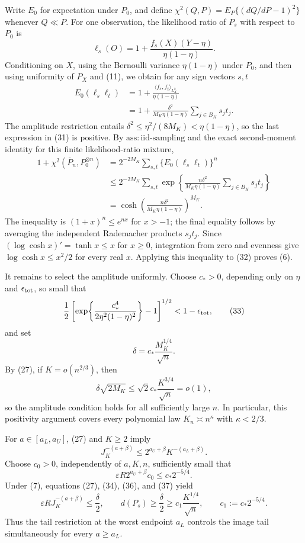 Write \(E_0\) for expectation under \(P_0\), and define \(\chi^2(Q,P)=E_P\{(dQ/dP-1)^2\}\) whenever \(Q\ll P\).  For one observation, the likelihood ratio of \(P_s\) with respect to \(P_0\) is
\[
\ell_s(O)
=1+\frac{f_s(X)(Y-\eta)}{\eta(1-\eta)}.
\tag{30}
\]
Conditioning on \(X\), using the Bernoulli variance \(\eta(1-\eta)\) under \(P_0\), and then using uniformity of \(P_X\) and (11), we obtain for any sign vectors \(s,t\)
\[
\begin{aligned}
E_0(\ell_s\ell_t)
&=1+\frac{\langle f_s,f_t\rangle_{L^2_X}}{\eta(1-\eta)} \\
&=1+\frac{\delta^2}{M_K\eta(1-\eta)}
      \sum_{j\in B_K}s_jt_j.
\end{aligned}
\tag{31}
\]
The amplitude restriction entails \(\delta^2\le\eta^2/(8M_K)<\eta(1-\eta)\), so the last expression in (31) is positive.  By \(\mathrm{ass:iid\mbox{-}sampling}\) and the exact second-moment identity for this finite likelihood-ratio mixture,
\[
\begin{aligned}
1+\chi^2(\overline P_n,P_0^{\otimes n})
&=2^{-2M_K}\sum_{s,t}\{E_0(\ell_s\ell_t)\}^n \\
&\le2^{-2M_K}\sum_{s,t}
\exp\!\left\{
 \frac{n\delta^2}{M_K\eta(1-\eta)}
 \sum_{j\in B_K}s_jt_j
\right\} \\
&=\cosh\!\left(
 \frac{n\delta^2}{M_K\eta(1-\eta)}
\right)^{M_K}.
\end{aligned}
\tag{32}
\]
The inequality is \((1+x)^n\le e^{nx}\) for \(x>-1\); the final equality follows by averaging the independent Rademacher products \(s_jt_j\).  Since \((\log\cosh x)'=\tanh x\le x\) for \(x\ge0\), integration from zero and evenness give \(\log\cosh x\le x^2/2\) for every real \(x\).  Applying this inequality to (32) proves (6).

It remains to select the amplitude uniformly.  Choose \(c_*>0\), depending only on \(\eta\) and \(\epsilon_{\rm tot}\), so small that
\[
\frac12\left[
\exp\!\left\{\frac{c_*^4}{2\eta^2(1-\eta)^2}\right\}-1
\right]^{1/2}<1-\epsilon_{\rm tot},
\tag{33}
\]
and set
\[
\delta=c_*\frac{M_K^{1/4}}{\sqrt n}.
\tag{34}
\]
By (27), if \(K=o(n^{2/3})\), then
\[
\delta\sqrt{2M_K}
\le\sqrt2c_*\frac{K^{3/4}}{\sqrt n}=o(1),
\tag{35}
\]
so the amplitude condition holds for all sufficiently large \(n\).  In particular, this positivity argument covers every polynomial law \(K_n\asymp n^\kappa\) with \(\kappa<2/3\).

For \(a\in[a_L,a_U]\), (27) and \(K\ge2\) imply
\[
J_K^{-(a+\beta)}
\le2^{a_U+\beta}K^{-(a_L+\beta)}.
\tag{36}
\]
Choose \(c_0>0\), independently of \(a,K,n\), sufficiently small that
\[
\varepsilon R2^{a_U+\beta}c_0
\le c_*2^{-5/4}.
\tag{37}
\]
Under (7), equations (27), (34), (36), and (37) yield
\[
\varepsilon RJ_K^{-(a+\beta)}\le\frac\delta2,
\qquad
d(P_s)\ge\frac\delta2
\ge c_1\frac{K^{1/4}}{\sqrt n},
\qquad
c_1:=c_*2^{-5/4}.
\tag{38}
\]
Thus the tail restriction at the worst endpoint \(a_L\) controls the image tail simultaneously for every \(a\ge a_L\).

